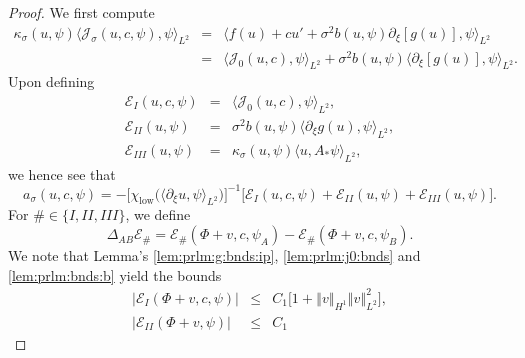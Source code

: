 \documentclass[10pt]{articleHJ}
\newcommand{\abs}[1]{\left\vert#1\right\vert}			%
\newcommand{\norm}[1]{\left\Vert#1\right\Vert}		%
\numberwithin{equation}{section}
\begin{document}
\begin{proof}
We first compute
\begin{equation}
\begin{array}{lcl}
\kappa_{\sigma}(u,\psi)
\langle \mathcal{J}_{\sigma}(u, c, \psi) ,
   \psi \rangle_{L^2}
& = &
  \langle
    f(u )
    +c u'
    +\sigma^2 b( u, \psi)
      \partial_\xi [g(u )]
   , \psi \rangle_{L^2}
\\[0.2cm]
& = &
  \langle \mathcal{J}_0(u , c) , \psi \rangle_{L^2}
    + \sigma^2 b(u, \psi)
    \langle \partial_\xi [g(u)], \psi \rangle_{L^2}.
\end{array}
\end{equation}
Upon defining
\begin{equation}
\begin{array}{lcl}
  \mathcal{E}_{I}(u,c,\psi) & = &
    \langle \mathcal{J}_0(u, c), \psi \rangle_{L^2},
\\[0.2cm]
  \mathcal{E}_{II}(u,\psi) & = &
      \sigma^2 b(u, \psi)
      \langle \partial_\xi g(u), \psi \rangle_{L^2},
\\[0.2cm]
  \mathcal{E}_{III}(u,\psi) & = &
    \kappa_{\sigma}(u, \psi) \langle u, A_* \psi \rangle_{L^2},
\end{array}
\end{equation}
we hence see that
\begin{equation}
a_\sigma(u, c, \psi) =
- \Big[ \chi_{\mathrm{low}}\big(\langle \partial_\xi u, \psi \rangle_{L^2} \big) \Big]^{-1}
\big[ \mathcal{E}_{I}(u,c,\psi)
  + \mathcal{E}_{II}(u,\psi)
  + \mathcal{E}_{III}(u,\psi)\big].
\end{equation}
For $\# \in \{I, II, III\}$,
we define
\begin{equation}
\Delta_{AB} \mathcal{E}_{\#}
= \mathcal{E}_{\#}(\Phi + v , c, \psi_A)
 - \mathcal{E}_{\#}(\Phi + v , c, \psi_B) .
\end{equation}
We note that
Lemma's
\ref{lem:prlm:g:bnds:ip},
\ref{lem:prlm:j0:bnds}
and \ref{lem:prlm:bnds:b}
yield the bounds
\begin{equation}
\begin{array}{lcl}
\abs{\mathcal{E}_{I}(\Phi +v , c, \psi )}
  & \le & C_1
  \big[1
     + \norm{v}_{H^1} \norm{v}_{L^2}^2 \big] ,
\\[0.2cm]
\abs{\mathcal{E}_{II}(\Phi + v, \psi)}
 & \le & C_1

\end{array}
\end{equation}
\end{proof}
\end{document}
